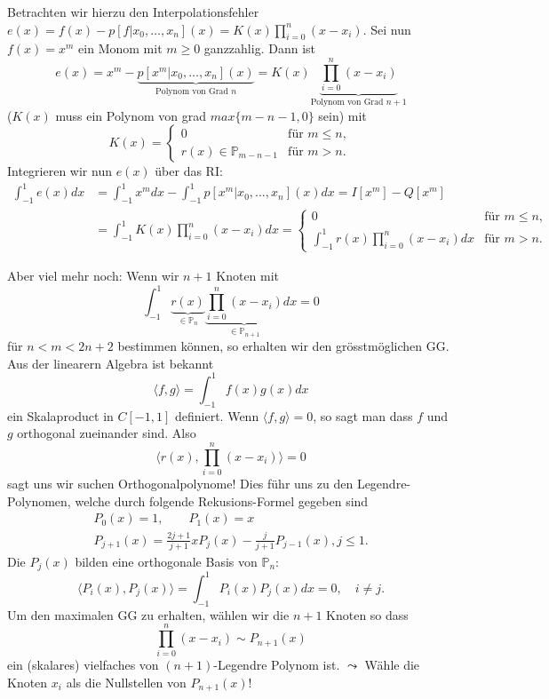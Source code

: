 \documentclass[a4paper]{article}
\begin{document}
Betrachten wir hierzu den Interpolationsfehler $ e(x) = f(x) - p[f | x_0,
\ldots, x_n] (x) = K(x) \prod_{i=0}^n (x - x_i) $.  Sei nun $f(x) = x^m$ ein
Monom mit $m \geq 0$ ganzzahlig. Dann ist
\[
  e(x) = x^m - \underbrace{
    p[x^m | x_0, \ldots, x_n](x)}_{\text{Polynom von Grad } n} =
  K(x) \underbrace{\prod_{i=0}^n (x - x_i)}_{\text{Polynom von Grad } n+1}
\]
($K(x)$ muss ein Polynom von grad $max\{m-n-1, 0\}$ sein) mit
\[
  K(x) = \begin{cases}
    0 & \text{für } m \leq n, \\
    r(x) \in \mathbb{P}_{m-n-1} & \text{für } m > n.
  \end{cases}
\]
Integrieren wir nun $e(x)$ über das RI:
\begin{align*}
  \int_{-1}^{1} e(x) dx
  &= \int_{-1}^{1} x^m dx - \int_{-1}^{1} p[x^m | x_0, \ldots, x_n](x) dx
  = I[x^m] - Q[x^m] \\
  &= \int_{-1}^{1} K(x) \prod_{i=0}^n (x - x_i) dx
  = \begin{cases}
    0 & \text{für } m \leq n, \\
    \int_{-1}^{1} r(x) \prod_{i=0}^n (x - x_i) dx & \text{für } m > n.
  \end{cases}
\end{align*}

Aber viel mehr noch: Wenn wir $n+1$ Knoten mit
\[
  \int_{-1}^{1} \underbrace{r(x)}_{\in \mathbb{P}_{n}}
    \underbrace{\prod_{i=0}^n (x - x_i)}_{\in \mathbb{P}_{n+1}} dx = 0
\]
für $n < m < 2n + 2$ bestimmen können, so erhalten wir den grösstmöglichen GG.
Aus der linearern Algebra ist bekannt
\[
  \langle f, g \rangle = \int_{-1}^{1} f(x) g(x) dx
\]
ein Skalaproduct in $C[-1,1]$ definiert. Wenn $\langle f,g \rangle = 0$, so
sagt man dass $f$ und $g$ orthogonal zueinander sind. Also
\[
  \biggl\langle r(x), \prod_{i=0}^n (x - x_i) \biggr\rangle = 0
\]
sagt uns wir suchen Orthogonalpolynome! Dies führ uns zu den
Legendre-Polynomen, welche durch folgende Rekusions-Formel gegeben sind
\begin{gather*}
  P_0(x) = 1, \qquad P_1(x) = x \\
  P_{j+1}(x) = \frac{2j+1}{j+1} x P_j(x) - \frac{j}{j+1} P_{j-1}(x), j \leq 1.
\end{gather*}
Die $P_j(x)$ bilden eine orthogonale Basis von $\mathbb{P}_n$:
\[
  \langle P_i(x), P_j(x) \rangle
    = \int_{-1}^{1} P_i(x) P_j(x) dx = 0, \quad i \neq j.
\]
Um den maximalen GG zu erhalten, wählen wir die $n+1$ Knoten so dass
\[
  \prod_{i=0}^n (x - x_i) \sim P_{n+1}(x)
\]
ein (skalares) vielfaches von $(n+1)$-Legendre Polynom ist. $\leadsto$ Wähle
die Knoten $x_i$ als die Nullstellen von $P_{n+1}(x)$!
\end{document}
